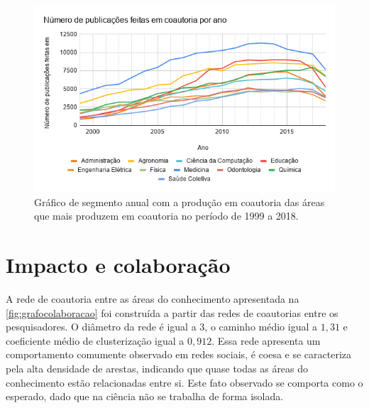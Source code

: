 \begin{figure}[htpb]
  \centering
  \includegraphics[width=1\textwidth]{figuras/resultados-grafico-coautoria-anual}
  \caption{Gráfico de segmento anual com a produção em coautoria das áreas que mais produzem em coautoria no período de 1999 a 2018.}
  \label{fig:coautoriaanual}
\end{figure}

\section{Impacto e colaboração}

A rede de coautoria entre as áreas do conhecimento apresentada na \autoref{fig:grafocolaboracao} foi construída a partir das redes de coautorias entre os pesquisadores. O diâmetro da rede é igual a $3$, o caminho médio igual a $1,31$ e coeficiente médio de clusterização igual a $0,912$. Essa rede apresenta um comportamento comumente observado em redes sociais, é coesa e se caracteriza pela alta densidade de arestas, indicando que quase todas as áreas do conhecimento estão relacionadas entre si. Este fato observado se comporta como o esperado, dado que na ciência não se trabalha de forma isolada.

